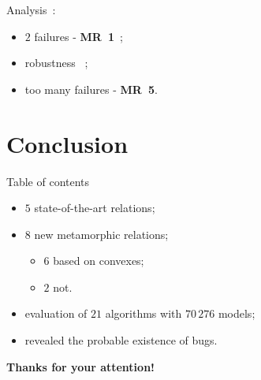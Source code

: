 \documentclass[aspectratio=169,dvipsnames]{beamer}
\newcommand{\cmark}{{\color{ForestGreen}{\ding{51}}}}
\begin{document}
\begin{frame}{\secname}
\begin{minipage}{0.3\textwidth}
		\vspace{\baselineskip}
		Analysis~:
		\begin{itemize}
			\item $2$ failures - \textbf{MR~1}~;
			\item robustness \cmark~;
			\item too many failures - \textbf{MR~5}.
		\end{itemize}
	\end{minipage}
\end{frame}


\section{Conclusion}

\begin{frame}{Table of contents}
	\tableofcontents[currentsection]
\end{frame}

\begin{frame}{\secname}
	\begin{itemize}
		\item $5$ state-of-the-art relations;
		\item $8$ new metamorphic relations;
		\begin{itemize}
			\item $6$ based on convexes;
			\item $2$ not.
		\end{itemize}
		\item evaluation of $21$ algorithms with $70\,276$ models;
		\item revealed the probable existence of bugs.
	\end{itemize}
\end{frame}


\begin{frame}
	\begin{center}
		\Large
		\textbf{Thanks for your attention!}
	\end{center}
\end{frame}
\end{document}
